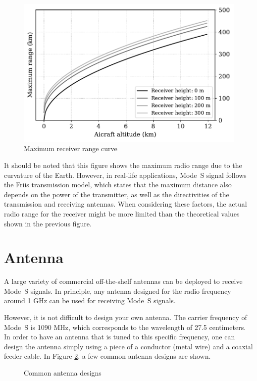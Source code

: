 \begin{figure}[ht]
  \centering
  \includegraphics[scale=0.6]{figures/quickstart/max_range_curve.pdf}
  \caption{Maximum receiver range curve}
  \label{fig:max_range_curve}
\end{figure}


It should be noted that this figure shows the maximum radio range due to the curvature of the Earth. However, in real-life applications, Mode~S signal follows the Friis transmission model, which states that the maximum distance also depends on the power of the transmitter, as well as the directivities of the transmission and receiving antennas. When considering these factors, the actual radio range for the receiver might be more limited than the theoretical values shown in the previous figure.

\section{Antenna}
A large variety of commercial off-the-shelf antennas can be deployed to receive Mode~S signals. In principle, any antenna designed for the radio frequency around 1 GHz can be used for receiving Mode~S signals.

However, it is not difficult to design your own antenna. The carrier frequency of Mode~S is 1090 MHz, which corresponds to the wavelength of 27.5 centimeters. In order to have an antenna that is tuned to this specific frequency, one can design the antenna simply using a piece of a conductor (metal wire) and a coaxial feeder cable. In Figure \ref{fig:antennas}, a few common antenna designs are shown.

\begin{figure}[ht]
  \centering
  
  \caption{Common antenna designs}
  \label{fig:antennas}
\end{figure}

